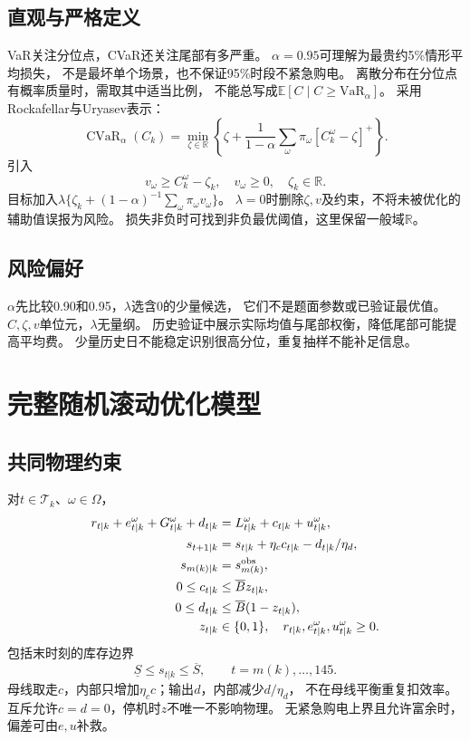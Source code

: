 \documentclass[UTF8,11pt]{ctexart}
\newcommand{\pos}[1]{\left[#1\right]^+}
\newcommand{\E}{\mathbb E}
\newcommand{\R}{\mathbb R}
\newcommand{\CVaR}{\operatorname{CVaR}}
\begin{document}
\subsection{直观与严格定义}
VaR关注分位点，CVaR还关注尾部有多严重。
$\alpha=0.95$可理解为最贵约5\%情形平均损失，
不是最坏单个场景，也不保证95\%时段不紧急购电。
离散分布在分位点有概率质量时，需取其中适当比例，
不能总写成$\E[C\mid C\geq\mathrm{VaR}_\alpha]$。
采用Rockafellar与Uryasev表示\cite{rockafellar2000}：
\begin{equation}\label{eq:cvar}
 \CVaR_\alpha(C_k)=\min_{\zeta\in\R}
 \left\{\zeta+\frac1{1-\alpha}\sum_\omega\pi_\omega\pos{C_k^\omega-\zeta}\right\}.
\end{equation}
引入
\begin{equation}\label{eq:cvarlin}
 v_\omega\geq C_k^\omega-\zeta_k,\quad v_\omega\geq0,\quad\zeta_k\in\R.
\end{equation}
目标加入$\lambda\{\zeta_k+(1-\alpha)^{-1}\sum_\omega\pi_\omega v_\omega\}$。
$\lambda=0$时删除$\zeta,v$及约束，不将未被优化的辅助值误报为风险。
损失非负时可找到非负最优阈值，这里保留一般域$\R$。

\subsection{风险偏好}
$\alpha$先比较0.90和0.95，$\lambda$选含0的少量候选，
它们不是题面参数或已验证最优值。
$C,\zeta,v$单位元，$\lambda$无量纲。
历史验证中展示实际均值与尾部权衡，降低尾部可能提高平均费。
少量历史日不能稳定识别很高分位，重复抽样不能补足信息。

\section{完整随机滚动优化模型}
\subsection{共同物理约束}
对$t\in\mathcal T_k$、$\omega\in\Omega$，
\begin{align}
 r_{t|k}+e^\omega_{t|k}+G^\omega_{t|k}+d_{t|k}
 &=L^\omega_{t|k}+c_{t|k}+u^\omega_{t|k},\label{eq:balance}\\
 s_{t+1|k}&=s_{t|k}+\eta_c c_{t|k}-d_{t|k}/\eta_d,\label{eq:soc}\\
 s_{m(k)|k}&=s^{\rm obs}_{m(k)},\label{eq:init}\\
 0\leq c_{t|k}&\leq\overline B z_{t|k},\label{eq:charge}\\
 0\leq d_{t|k}&\leq\overline B(1-z_{t|k}),\label{eq:discharge}\\
 z_{t|k}&\in\{0,1\},\quad r_{t|k},e^\omega_{t|k},u^\omega_{t|k}\geq0 .
\end{align}
包括末时刻的库存边界
\begin{equation}\label{eq:bounds}
 \underline S\leq s_{t|k}\leq\overline S,\qquad t=m(k),\ldots,145.
\end{equation}
母线取走$c$，内部只增加$\eta_cc$；输出$d$，内部减少$d/\eta_d$，
不在母线平衡重复扣效率。
互斥允许$c=d=0$，停机时$z$不唯一不影响物理。
无紧急购电上界且允许富余时，偏差可由$e,u$补救。
\end{document}
